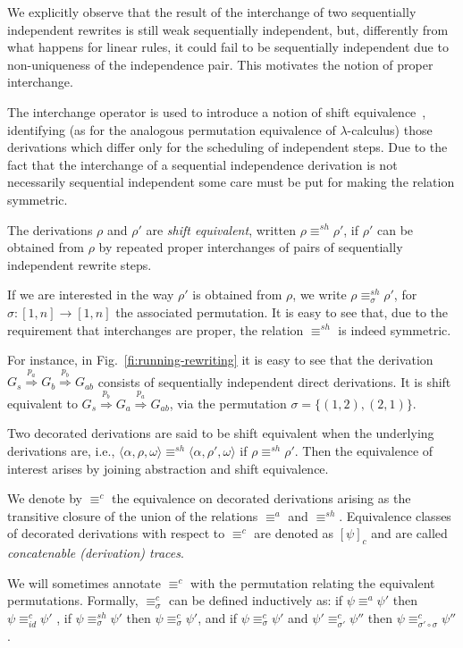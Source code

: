 \documentclass[conference]{IEEEtran}
\newcommand{\Rrel}[1]   {\stackrel{{#1}}{\Longrightarrow}}
\newcommand{\interval}[2][1]{\ensuremath{[{#1},{#2}]}}
\newcommand{\perm}{\sigma}
\begin{document}
We explicitly observe that the result of the interchange of two
sequentially independent rewrites is still weak sequentially
independent, but, differently from what happens for linear rules, it
could fail to be sequentially independent due to non-uniqueness of the
independence pair. This motivates the notion of proper interchange.


The interchange operator is used to introduce a notion of shift
equivalence~\cite{CMREHL:AAGT}, identifying (as for the analogous
permutation equivalence of $\lambda$-calculus) those derivations which
differ only for the scheduling of independent steps. Due to the fact
that the interchange of a sequential independence derivation is not
necessarily sequential independent some care must be put for making the
relation symmetric.

\begin{definition}
  \label{de:shift-equivalence}
  The derivations $\rho$ and $\rho'$ are \emph{shift equivalent},
  written $\rho \equiv^{sh} \rho'$, if $\rho'$ can be obtained from
  $\rho$ by repeated proper interchanges of pairs of
  sequentially independent rewrite steps.
\end{definition}
%
If we are
interested in the way $\rho'$ is obtained from $\rho$, we write
$\rho \equiv^{sh}_\perm \rho'$, for
$\perm : \interval{n} \to \interval{n}$ the associated permutation.
%
It is easy to see that, due to the requirement that interchanges are proper, the relation $\equiv^{sh}$ is indeed symmetric.

For instance, in Fig.~\ref{fi:running-rewriting} it is easy to see
that the derivation $G_s \Rrel{p_a} G_b \Rrel{p_b} G_{ab}$
consists of sequentially independent direct derivations. It is shift
equivalent to $G_s \Rrel{p_b} G_a \Rrel{p_a} G_{ab}$,
via the permutation $\perm = \{(1,2),(2,1)\}$.

Two decorated derivations are said to be shift equivalent when the
underlying derivations are, i.e.,
$\langle \alpha, \rho, \omega \rangle \equiv^{sh} \langle \alpha,
\rho', \omega \rangle$ if $\rho \equiv^{sh} \rho'$. Then the
equivalence of interest arises by joining abstraction and shift equivalence.

\begin{definition}
  We denote by $\equiv^c$ the equivalence on decorated derivations
  arising as the transitive closure of the union of the relations
  $\equiv^{a}$ and $\equiv^{sh}$.
%
  Equivalence classes of decorated derivations with respect to
  $\equiv^c$ are denoted as $[\psi]_c$ and are called
  \emph{concatenable (derivation) traces}.
\end{definition}
%
We will sometimes annotate $\equiv^c$ with the permutation relating
the equivalent permutations. Formally, $\equiv^c_\sigma$ can be
defined inductively as: if $\psi \equiv^{a} \psi'$ then
$\psi \equiv^c_{id} \psi'$ , if $\psi \equiv^{sh}_{\sigma} \psi'$ then
$\psi \equiv^c_{\sigma} \psi'$, and if
$\psi \equiv^{c}_{\sigma} \psi'$ and
$\psi' \equiv^{c}_{\sigma'} \psi''$ then
$\psi \equiv^{c}_{\sigma' \circ \sigma} \psi''$.
\end{document}
